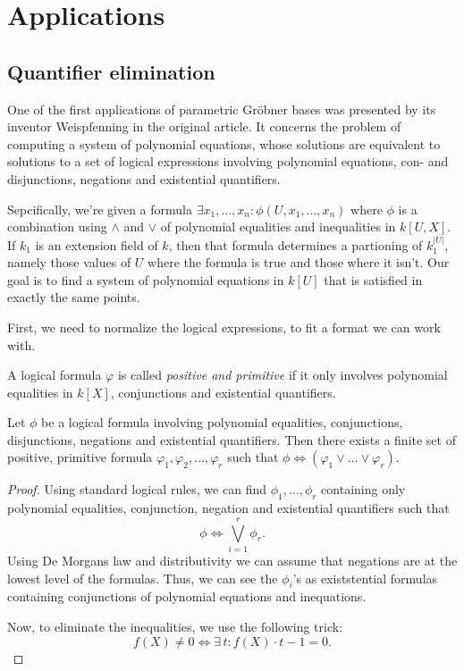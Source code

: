 \section{Applications}

\subsection{Quantifier elimination}
One of the first applications of parametric Gröbner bases was presented by its inventor Weispfenning \cite{Weispfenning} in the original article. It concerns the problem of computing a system of polynomial equations, whose solutions are equivalent to solutions to a set of logical expressions involving polynomial equations, con- and disjunctions, negations and existential quantifiers.

Sepcifically, we're given a formula $\exists x_{1}, \dots, x_{n} : \phi(U, x_{1}, \dots, x_{n})$ where $\phi$ is a combination using $\land$ and $\lor$ of polynomial equalities and inequalities in $k[U, X]$. If $k_{1}$ is an extension field of $k$, then that formula determines a partioning of $k_{1}^{|U|}$, namely those values of $U$ where the formula is true and those where it isn't. Our goal is to find a system of polynomial equations in $k[U]$ that is satisfied in exactly the same points.

First, we need to normalize the logical expressions, to fit a format we can work with.

\begin{definition}
  A logical formula $\varphi$ is called \textit{positive and primitive} if it only involves polynomial equalities in $k[X]$, conjunctions and existential quantifiers.
\end{definition}

\begin{lemma}\label{lem:logical_positive}
  Let $\phi$ be a logical formula involving polynomial equalities, conjunctions, disjunctions, negations and existential quantifiers. Then there exists a finite set of positive, primitive formula $\varphi_{1}, \varphi_{2}, \dots, \varphi_{r}$ such that $\phi \iff (\varphi_{1} \lor \dots \lor \varphi_{r})$.
\end{lemma}
\begin{proof}
  Using standard logical rules, we can find $\phi_{1}, \dots, \phi_{r}$ containing only polynomial equalities, conjunction, negation and existential quantifiers such that \[\phi \iff \bigvee_{i=1}^{r} \phi_{r}.\] Using De Morgans law and distributivity we can assume that negations are at the lowest level of the formulas. Thus, we can see the $\phi_{i}$'s as existstential formulas containing conjunctions of polynomial equations and inequations.

  Now, to eliminate the inequalities, we use the following trick: \[f(X) \neq 0 \iff \exists\, t : f(X) \cdot t - 1 = 0.\]
\end{proof}

